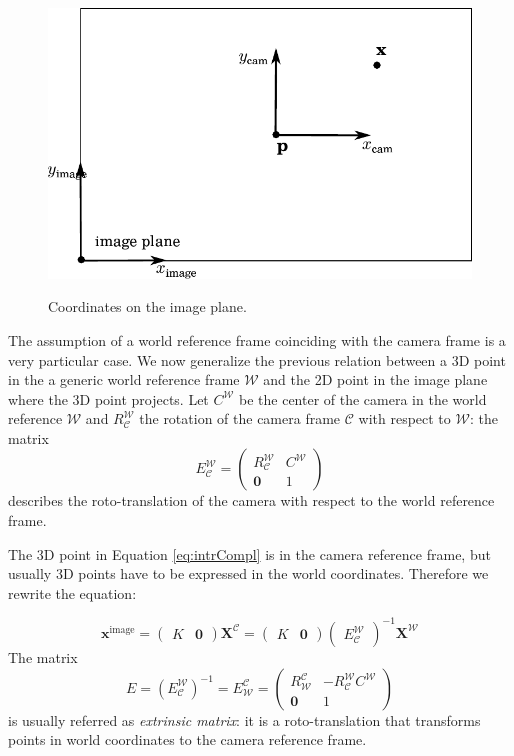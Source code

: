 \begin{figure}[t]
  \includegraphics[width=0.8\columnwidth]{./img/ch-camera/camera02}\\
 \caption{Coordinates on the image plane.}
 \label{fig:centercamera}
\end{figure}
The assumption of a world reference frame coinciding with the camera frame is a very particular case. We now generalize the previous relation between a 3D point in the a generic world reference frame $\mathcal{W}$ and the 2D point in the image plane where the 3D point projects.
Let $C^\mathcal{W}$ be the center of the camera in the world reference $\mathcal{W}$ and  $R_\mathcal{C}^\mathcal{W}$ the rotation of the camera frame $\mathcal{C}$ with respect to $\mathcal{W}$: the matrix 
\begin{equation}
E_\mathcal{C}^\mathcal{W} = 
\begin{pmatrix}
R_\mathcal{C}^\mathcal{W} &C^\mathcal{W}\\
\mathbf{0}&1
 \end{pmatrix}   
\end{equation}
 describes the roto-translation of the camera with respect to the world reference frame.

The 3D point in Equation \ref{eq:intrCompl} is in the camera reference frame, but usually 3D points have to be expressed in the world coordinates. Therefore we rewrite the equation:


\begin{equation}
 \mathbf{x}^{\text{image}} =
\begin{pmatrix}
 K &\mathbf{0}
 \end{pmatrix} 
 \mathbf{X}^\mathcal{C}
 = 
\begin{pmatrix}
 K &\mathbf{0}
 \end{pmatrix} 
\begin{pmatrix}
 E_\mathcal{C}^\mathcal{W}
 \end{pmatrix}^{-1}
 \mathbf{X}^\mathcal{W}
\end{equation}
The matrix 
\begin{equation}
  E = (E_\mathcal{C}^\mathcal{W})^{-1} = E_{\mathcal{W}}^{\mathcal{C}} = 
\begin{pmatrix}
R_\mathcal{W}^\mathcal{C} & - R_\mathcal{C}^\mathcal{W} C^\mathcal{W}\\
\mathbf{0}&1
 \end{pmatrix}
\end{equation}
is usually referred as \emph{extrinsic matrix}: it is a roto-translation that transforms points in world coordinates to the camera reference frame.

